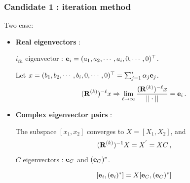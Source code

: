 \documentclass[mathserif, handout]{beamer}
\begin{document}
\begin{frame}
  \frametitle{Candidate 1 : iteration method}

  Two case:
  \begin{itemize}
  \item {\color{green} \textbf{Real eigenvectors} }:

    $i_{th}$ eigenvector :
    $\jEigvec[i]=(a_{1},a_{2},\cdots,a_{i},0,\cdots, 0)^\top $.

    \vspace{1em}
    Let $x=(b_{1},b_{2},\cdots,b_{i},0,\cdots, 0)^\top
    =\sum_{j=1}^{i}\alpha_{j}\jEigvec[j]$.
    \[
    (\ps{R}{k})^{-\ell}x
    \Rightarrow
    \lim_{\ell\to \infty} \frac{(\ps{R}{k})^{-\ell}x}{||\cdot||}=\jEigvec[i]
    \,.
    \]

    \pause

  \item {\color{green} \textbf{Complex eigenvector pairs} }:

    The subspace $[x_1, x_2]$ converges to $X=[X_{1},X_{2}]$, and
    \[
      (\ps{R}{k})^{-1}X=X^{'}=XC
      \,,
      \label{eq:similar}
    \]
    $C$ eigenvectors : $\jEigvec[C]$ and $(\jEigvec[C])^{*}$.

    \[
    [\jEigvec[i],(\jEigvec[i])^{*}]=X[\jEigvec[C],(\jEigvec[C])^{*}]
    \]
  \end{itemize}



\end{frame}
\end{document}
